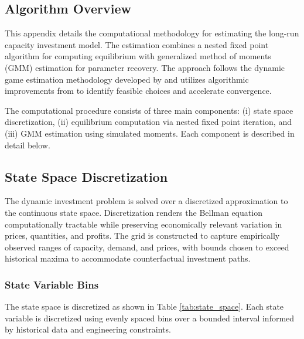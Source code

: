 \documentclass[12pt]{article}
\begin{document}
\subsection{Algorithm Overview}\label{sec:algorithm_overview}

This appendix details the computational methodology for estimating the long-run capacity investment model. The estimation combines a nested fixed point algorithm for computing equilibrium with generalized method of moments (GMM) estimation for parameter recovery. The approach follows the dynamic game estimation methodology developed by \cite{pakes1998empirical} and utilizes algorithmic improvements from \cite{gowrisankaran2024computable} to identify feasible choices and accelerate convergence.

The computational procedure consists of three main components: (i) state space discretization, (ii) equilibrium computation via nested fixed point iteration, and (iii) GMM estimation using simulated moments. Each component is described in detail below.

\subsection{State Space Discretization}\label{sec:state_space}

The dynamic investment problem is solved over a discretized approximation to the continuous state space. Discretization renders the Bellman equation computationally tractable while preserving economically relevant variation in prices, quantities, and profits. The grid is constructed to capture empirically observed ranges of capacity, demand, and prices, with bounds chosen to exceed historical maxima to accommodate counterfactual investment paths.

\subsubsection{State Variable Bins}\label{subsec:state_bins}

The state space is discretized as shown in Table \ref{tab:state_space}. Each state variable is discretized using evenly spaced bins over a bounded interval informed by historical data and engineering constraints.
\end{document}
